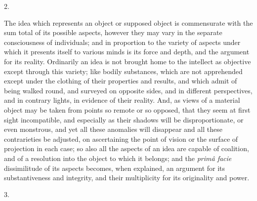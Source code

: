 2.

The idea which represents an object or supposed object
is commensurate with the sum total of its possible
aspects, however they may vary in the separate
consciousness of individuals; and in proportion to the
variety of aspects under which it presents itself to
various minds is its force and depth, and the argument
for its reality. Ordinarily an idea is not brought home
to the intellect as objective except through this
variety; like bodily substances, which are not
apprehended except under the clothing of their properties
and results, and which admit of being walked round, and
surveyed on opposite sides, and in different
perspectives, and in contrary lights, in evidence of
their reality. And, as views of a material object may be
taken from points so remote or so opposed, that they seem
at first sight incompatible, and especially as their
shadows will be disproportionate, or even monstrous, and
yet all these anomalies will disappear and all these
contrarieties be adjusted, on ascertaining the point of
vision or the surface of projection in each case; so also
all the aspects of an idea are capable of coalition, and
of a resolution into the object to which it belongs; and
the \emph{primâ facie} dissimilitude of its aspects
becomes, when explained, an argument for its
substantiveness and integrity, and their multiplicity for
its originality and power.

3.

